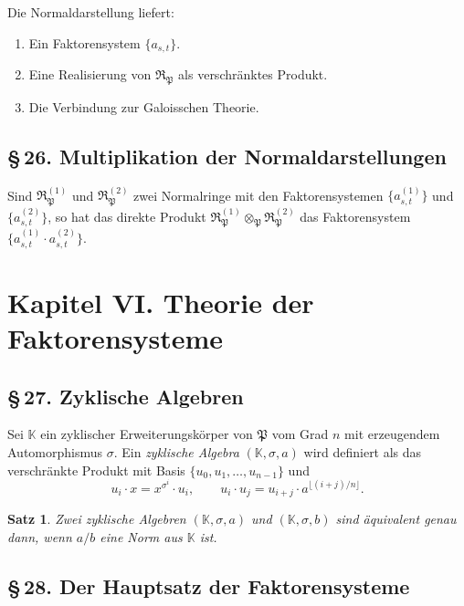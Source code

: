 \documentclass[10pt,a4paper]{article}
\theoremstyle{plain}
\newtheorem{satz}{Satz}[section]
\theoremstyle{definition}
\theoremstyle{remark}
\newcommand{\KK}{\mathbb{K}}
\newcommand{\tensor}{\otimes}\newcommand{\Tensor}{\bigotimes}
\begin{document}
Die Normaldarstellung liefert:
\begin{enumerate}
\item Ein Faktorensystem $\{a_{s,t}\}$.
\item Eine Realisierung von $\mathfrak{R}_\mathfrak{P}$ als verschr\"anktes Produkt.
\item Die Verbindung zur Galoisschen Theorie.
\end{enumerate}

\subsection*{\S\,26. Multiplikation der Normaldarstellungen}

Sind $\mathfrak{R}_\mathfrak{P}^{(1)}$ und $\mathfrak{R}_\mathfrak{P}^{(2)}$ zwei Normalringe mit den Faktorensystemen $\{a_{s,t}^{(1)}\}$ und $\{a_{s,t}^{(2)}\}$, so hat das direkte Produkt $\mathfrak{R}_\mathfrak{P}^{(1)} \tensor_\mathfrak{P} \mathfrak{R}_\mathfrak{P}^{(2)}$ das Faktorensystem $\{a_{s,t}^{(1)} \cdot a_{s,t}^{(2)}\}$.

\newpage
\section*{Kapitel VI. Theorie der Faktorensysteme}

\subsection*{\S\,27. Zyklische Algebren}

Sei $\KK$ ein zyklischer Erweiterungsk\"orper von $\mathfrak{P}$ vom Grad $n$ mit erzeugendem Automorphismus $\sigma$. Ein \emph{zyklische Algebra} $(\KK, \sigma, a)$ wird definiert als das verschr\"ankte Produkt mit Basis $\{u_0, u_1, \ldots, u_{n-1}\}$ und
\[
u_i \cdot x = x^{\sigma^i} \cdot u_i, \qquad u_i \cdot u_j = u_{i+j} \cdot a^{\lfloor (i+j)/n \rfloor}.
\]

\begin{satz}
Zwei zyklische Algebren $(\KK, \sigma, a)$ und $(\KK, \sigma, b)$ sind \"aquivalent genau dann, wenn $a/b$ eine Norm aus $\KK$ ist.
\end{satz}

\subsection*{\S\,28. Der Hauptsatz der Faktorensysteme}
\end{document}
